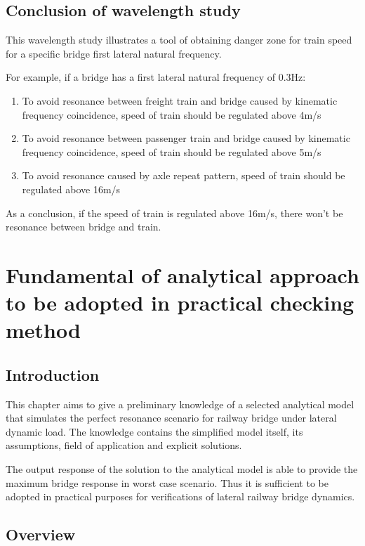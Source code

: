 \section{Conclusion of wavelength study}

This wavelength study illustrates a tool of obtaining danger zone for train speed for a specific bridge first lateral natural frequency. 

For example, if a bridge has a first lateral natural frequency of 0.3Hz:

\begin{enumerate}
\item To avoid resonance between freight train and bridge caused by kinematic frequency coincidence, speed of train should be regulated above 4m/s

\item To avoid resonance between passenger train and bridge caused by kinematic frequency coincidence, speed of train should be regulated above 5m/s

\item To avoid resonance caused by axle repeat pattern, speed of train should be regulated above 16m/s

\end{enumerate}

As a conclusion, if the speed of train is regulated above 16m/s, there won't be resonance between bridge and train.


\chapter{Fundamental of analytical approach to be adopted in practical checking method}
 
\section{Introduction}
This chapter aims to give a preliminary knowledge of a selected analytical model that simulates the perfect resonance scenario for railway bridge under lateral dynamic load. The knowledge contains the simplified model itself, its assumptions, field of application and explicit solutions. 

The output response of the solution to the analytical model is able to provide the maximum bridge response in worst case scenario. Thus it is sufficient to be adopted in practical purposes for verifications of lateral railway bridge dynamics.


\section{Overview}

